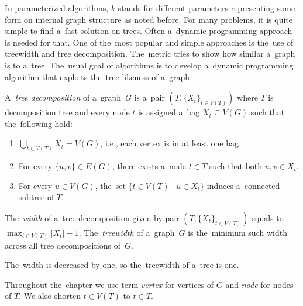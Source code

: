 In parameterized algorithms, \( k \) stands for different parameters
representing some form on internal graph structure as noted before.
%
For many problems, it is quite simple to find a~fast solution on trees.
Often a~dynamic programming approach is needed for that.
%
One of the~most popular and simple approaches
is the~use of treewidth and tree decomposition.
The~metric tries to show how similar a~graph is to a~tree.
%
The~usual goal of algorithms is to develop a~dynamic programming algorithm
that exploits the~tree-likeness of a~graph.

%
\begin{definition}
	A~\emph{tree decomposition} of a~graph~\( G \) is
	a~pair \( (T, {\{X_t\}}_{t \in V ( T )}) \)
	where \( T \) is decomposition tree and every node \( t \)
	is assigned a~bag \( X_t \subseteq V(G) \) such that the~following hold:
	\begin{enumerate}
		\item \( \bigcup_{t \in V(T)} X_t = V(G) \),
		      i.e., each vertex is in at least one bag.
		\item For every \( \{u,v\} \in E(G) \), there exists
		      a~node \( t \in T \) such that both \( u, v \in X_t \).
		\item For every \( u \in V(G) \),
		      the~set \( \{t \in V(T) \mid u \in X_t\} \)
		      induces a~connected subtree of \( T \).
	\end{enumerate}
\end{definition}
%
\begin{definition}
	The~\emph{width} of a~tree decomposition given by pair
	\( (T, {\{X_t\}}_{t \in V ( T )}) \)
	equals to \( \max_{t\in V(T)} |X_t| - 1 \).
	The~\emph{treewidth} of a~graph~\( G \) is the~minimum such width
	across all tree decompositions of~\( G \).
\end{definition}
%
The~width is decreased by one, so the~treewidth of a~tree is one.

Throughout the~chapter we use term \emph{vertex} for vertices of \( G \)
and \emph{node} for nodes of \( T \).
We also shorten \( t \in V(T) \) to \( t \in T \).

